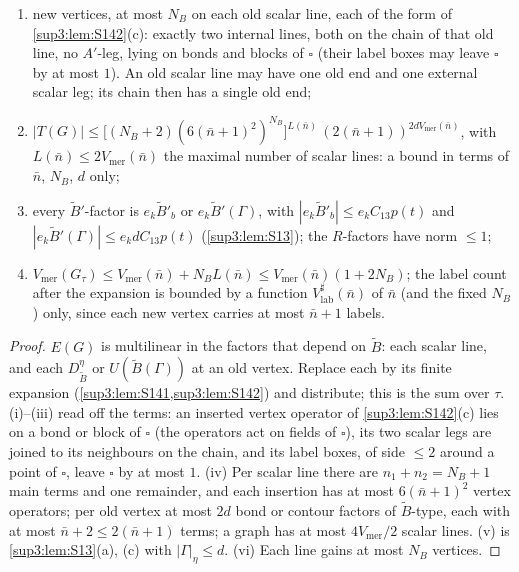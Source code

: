 \begin{lemma}
\begin{enumerate}[label=\textup{(\roman*)},nosep,leftmargin=*]
\item new vertices, at most $N_B$ on each old scalar line, each of the form of \cref{sup3:lem:S142}(c): exactly two internal lines, both on the chain of that old line, no $A'$-leg, lying on bonds and blocks of $\square$ (their label boxes may leave $\square$ by at most $1$). An old scalar line may have one old end and one external scalar leg; its chain then has a single old end;
\item $|T(G)|\le\big[(N_B+2)(6(\bar n+1)^2)^{N_B}\big]^{L(\bar n)}\,(2(\bar n+1))^{2dV_{\mathrm{mer}}(\bar n)}$, with $L(\bar n)\le2V_{\mathrm{mer}}(\bar n)$ the maximal number of scalar lines: a bound in terms of $\bar n$, $N_B$, $d$ only;
\item every $\tilde B'$-factor is $e_k\tilde B'_b$ or $e_k\tilde B'(\Gamma)$, with $|e_k\tilde B'_b|\le e_kC_{13}p(t)$ and $|e_k\tilde B'(\Gamma)|\le e_kdC_{13}p(t)$ (\cref{sup3:lem:S13}); the $R$-factors have norm $\le1$;
\item $V_{\mathrm{mer}}(G_\tau)\le V_{\mathrm{mer}}(\bar n)+N_BL(\bar n)\le V_{\mathrm{mer}}(\bar n)(1+2N_B)$; the label count after the expansion is bounded by a function $V^\sharp_{\mathrm{lab}}(\bar n)$ of $\bar n$ (and the fixed $N_B$) only, since each new vertex carries at most $\bar n+1$ labels.
\end{enumerate}
\end{lemma}

\begin{proof}
$E(G)$ is multilinear in the factors that depend on $\tilde B$: each scalar line, and each $D^\eta_{\tilde B}$ or $U(\tilde B(\Gamma))$ at an old vertex. Replace each by its finite expansion (\cref{sup3:lem:S141,sup3:lem:S142}) and distribute; this is the sum over $\tau$. (i)--(iii) read off the terms: an inserted vertex operator of \cref{sup3:lem:S142}(c) lies on a bond or block of $\square$ (the operators act on fields of $\square$), its two scalar legs are joined to its neighbours on the chain, and its label boxes, of side $\le2$ around a point of $\square$, leave $\square$ by at most $1$. (iv) Per scalar line there are $n_1+n_2=N_B+1$ main terms and one remainder, and each insertion has at most $6(\bar n+1)^2$ vertex operators; per old vertex at most $2d$ bond or contour factors of $\tilde B$-type, each with at most $\bar n+2\le2(\bar n+1)$ terms; a graph has at most $4V_{\mathrm{mer}}/2$ scalar lines. (v) is \cref{sup3:lem:S13}(a), (c) with $|\Gamma|_\eta\le d$. (vi) Each line gains at most $N_B$ vertices.
\end{proof}

